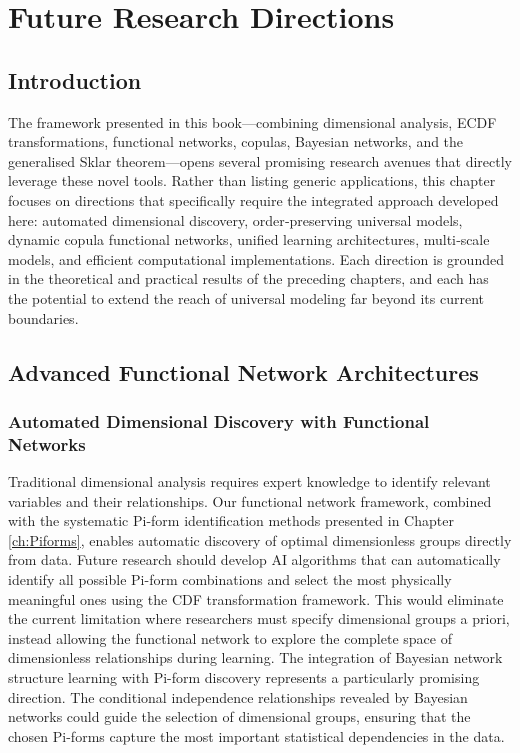 \startcontents[chapter]
\chapter{Future Research Directions}
\label{ch:Futuredirections}
\minitocboxed

\section*{Introduction}
The framework presented in this book—combining dimensional analysis, ECDF transformations, functional networks, copulas, Bayesian networks, and the generalised Sklar theorem—opens several promising research avenues that directly leverage these novel tools. Rather than listing generic applications, this chapter focuses on directions that specifically require the integrated approach developed here: automated dimensional discovery, order‑preserving universal models, dynamic copula functional networks, unified learning architectures, multi‑scale models, and efficient computational implementations. Each direction is grounded in the theoretical and practical results of the preceding chapters, and each has the potential to extend the reach of universal modeling far beyond its current boundaries.

\section{Advanced Functional Network Architectures}
\subsection{Automated Dimensional Discovery with Functional Networks}
Traditional dimensional analysis requires expert knowledge to identify relevant variables and their relationships. Our functional network framework, combined with the systematic Pi-form identification methods presented in Chapter \ref{ch:Piforms}, enables automatic discovery of optimal dimensionless groups directly from data.
Future research should develop AI algorithms that can automatically identify all possible Pi-form combinations and select the most physically meaningful ones using the CDF transformation framework. This would eliminate the current limitation where researchers must specify dimensional groups a priori, instead allowing the functional network to explore the complete space of dimensionless relationships during learning.
The integration of Bayesian network structure learning with Pi-form discovery represents a particularly promising direction. The conditional independence relationships revealed by Bayesian networks could guide the selection of dimensional groups, ensuring that the chosen Pi-forms capture the most important statistical dependencies in the data.

